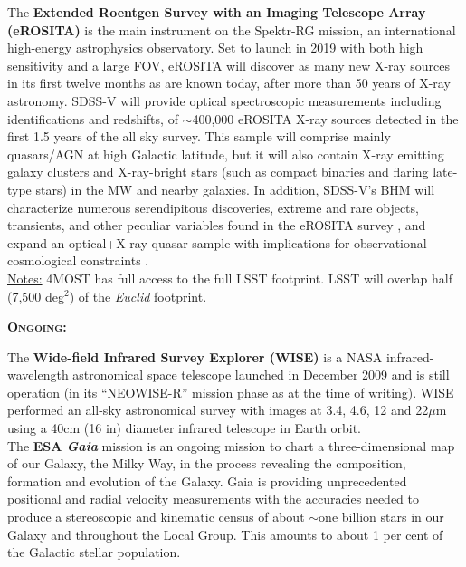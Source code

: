 \begin{framed}
The {\bf Extended Roentgen Survey with an Imaging Telescope Array
(eROSITA)} is the main instrument on the Spektr-RG mission, an
international high-energy astrophysics observatory.  Set to launch in
2019 with both high sensitivity and a large FOV, eROSITA will discover as many
new X-ray sources in its first twelve months as are known today, after
more than 50 years of X-ray astronomy.  SDSS-V will provide optical
spectroscopic measurements including
identifications and redshifts, of $\sim$400,000 eROSITA X-ray sources
detected in the first 1.5 years of the all sky survey. 
This sample will comprise mainly quasars/AGN at high Galactic
latitude, but it will also contain X-ray emitting galaxy clusters and
X-ray-bright stars (such as compact binaries and flaring late-type
stars) in the MW and nearby galaxies. In addition, SDSS-V's BHM will
characterize numerous serendipitous discoveries, extreme and rare
objects, transients, and other peculiar variables found in the eROSITA
survey \citep{Merloni2012}, and expand an optical+X-ray quasar sample
with implications for observational cosmological constraints
\citep[e.g.][]{Risaliti_Lusso2015}. 
\\

\underline{Notes:} 4MOST has full access to the full LSST
footprint. LSST will overlap half (7,500 deg$^2$) of the {\it Euclid}
footprint. \\

\hrulefill 

\noindent
\textbf{\textsc{Ongoing:}} 

The {\bf Wide-field Infrared Survey Explorer (WISE)} is a NASA
infrared-wavelength astronomical space telescope launched in December
2009 and is still operation (in its ``NEOWISE-R'' mission phase as at
the time of writing). WISE performed an all-sky astronomical survey
with images at 3.4, 4.6, 12 and 22$\mu$m using a 40cm (16 in) diameter
infrared telescope in Earth orbit. \\



The \textbf{ESA {\it Gaia}} mission is an ongoing mission to chart a
three-dimensional map of our Galaxy, the Milky Way, in the process
revealing the composition, formation and evolution of the Galaxy. Gaia
is providing unprecedented positional and radial velocity measurements
with the accuracies needed to produce a stereoscopic and kinematic
census of about $\sim$one billion stars in our Galaxy and throughout
the Local Group. This amounts to about 1 per cent of the Galactic
stellar population.
\end{framed}

